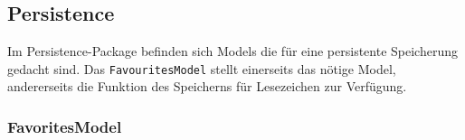 \subsection{Persistence}

Im Persistence-Package befinden sich Models die für eine persistente Speicherung gedacht sind. Das \lstinline|FavouritesModel| stellt einerseits das nötige Model, andererseits die Funktion des Speicherns für Lesezeichen zur Verfügung.

\subsubsection{FavoritesModel}


